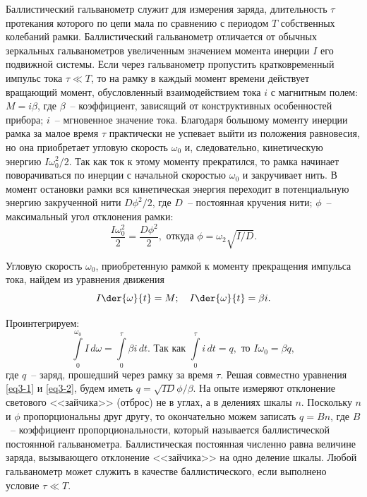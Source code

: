 \documentclass[pscyr,titlepage]{hedreport}
\begin{document}
  Баллистический гальванометр служит для измерения заряда, длительность
  \( \tau \) протекания которого по цепи мала по сравнению с периодом \( T \)
  собственных колебаний рамки. Баллистический гальванометр отличается от обычных
  зеркальных гальванометров увеличенным значением момента инерции \( I \) его
  подвижной системы. Если через гальванометр пропустить кратковременный импульс
  тока \( \tau \ll T \), то на рамку в каждый момент времени действует вращающий
  момент, обусловленный взаимодействием тока \( i \) с магнитным полем:
  \( M = i\beta \), где \( \beta \)~-- коэффициент, зависящий от конструктивных
  особенностей прибора; \( i \)~-- мгновенное значение тока. Благодаря большому
  моменту инерции рамка за малое время \( \tau \) практически не успевает выйти
  из положения равновесия, но она приобретает угловую скорость \( \omega_0 \) и,
  следовательно, кинетическую энергию \( I\omega_0^2/2 \). Так как ток к этому
  моменту прекратился, то рамка начинает поворачиваться по инерции с начальной
  скоростью \( \omega_0 \) и закручивает нить. В момент остановки рамки вся
  кинетическая энергия переходит в потенциальную энергию закрученной нити
  \( D\phi^2/2 \), где \( D \)~-- постоянная кручения нити; \( \phi \)~--
  максимальный угол отклонения рамки:
  \begin{equation}
    \frac{I\omega_0^2}{2} = \frac{D\phi^2}{2}, \text{ откуда }
    \phi = \omega_2\sqrt{I/D}.
    \label{eq3-1}
  \end{equation}

  Угловую скорость \( \omega_0 \), приобретенную рамкой к моменту прекращения
  импульса тока, найдем из уравнения движения
  \[
    I\der{\omega}{t} = M; \quad I\der{\omega}{t} = \beta i.
  \]

  Проинтегрируем:
  \begin{equation}
    \int\limits_0^{\omega_0} I\,d\omega = \int\limits_0^\tau \beta i\,dt.
    \text{ Так как } \int\limits_0^\tau i\,dt = q, \text{ то }
    I\omega_0 = \beta q,
    \label{eq3-2}
  \end{equation}
  где \( q \)~-- заряд, прошедший через рамку за время \( \tau \). Решая
  совместно уравнения \eqref{eq3-1} и \eqref{eq3-2}, будем иметь
  \( q = \sqrt{ID}\phi/\beta \). На опыте измеряют отклонение светового
  <<зайчика>> (отброс) не в углах, а в делениях шкалы \( n \). Поскольку
  \( n \) и \( \phi \) пропорциональны друг другу, то окончательно можем
  записать \( q = Bn \), где \( B \)~-- коэффициент пропорциональности, который
  называется баллистической постоянной гальванометра. Баллистическая постоянная
  численно равна величине заряда, вызывающего отклонение <<зайчика>> на одно
  деление шкалы. Любой гальванометр может служить в качестве баллистического,
  если выполнено условие \( \tau \ll T \).
\end{document}
